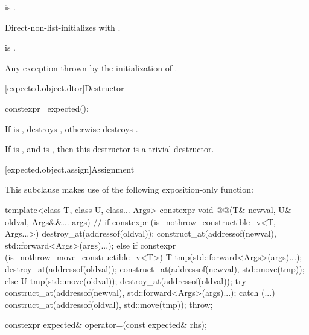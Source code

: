 \begin{itemdescr}
\pnum
\constraints
{} is .

\pnum
\effects
Direct-non-list-initializes  with
.

\pnum
\ensures
{} is .

\pnum
\throws
Any exception thrown by the initialization of .
\end{itemdescr}

[expected.object.dtor]{Destructor}

%
\begin{itemdecl}
constexpr ~expected();
\end{itemdecl}

\begin{itemdescr}
\pnum
\effects
If  is , destroys ,
otherwise destroys .

\pnum
\remarks
If  is , and
 is ,
then this destructor is a trivial destructor.
\end{itemdescr}

[expected.object.assign]{Assignment}

\pnum
This subclause makes use of the following exposition-only function:
\begin{codeblock}
template<class T, class U, class... Args>
constexpr void @@(T& newval, U& oldval, Args&&... args) {  // \expos
  if constexpr (is_nothrow_constructible_v<T, Args...>) {
    destroy_at(addressof(oldval));
    construct_at(addressof(newval), std::forward<Args>(args)...);
  } else if constexpr (is_nothrow_move_constructible_v<T>) {
    T tmp(std::forward<Args>(args)...);
    destroy_at(addressof(oldval));
    construct_at(addressof(newval), std::move(tmp));
  } else {
    U tmp(std::move(oldval));
    destroy_at(addressof(oldval));
    try {
      construct_at(addressof(newval), std::forward<Args>(args)...);
    } catch (...) {
      construct_at(addressof(oldval), std::move(tmp));
      throw;
    }
  }
}
\end{codeblock}

%
\begin{itemdecl}
constexpr expected& operator=(const expected& rhs);
\end{itemdecl}

